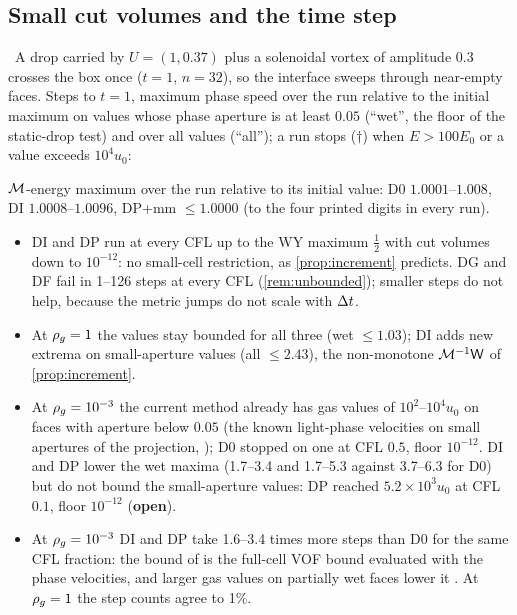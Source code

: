 \subsection{Small cut volumes and the time step}\label{sec:smallcell}
\meas\ A drop carried by $U=(1,0.37)$ plus a solenoidal vortex of amplitude $0.3$ crosses
the box once ($t=1$, $n=32$), so the interface sweeps through near-empty faces.  Steps to
$t=1$, maximum phase speed over the run relative to the initial maximum on values whose phase
aperture is at least $0.05$ (``wet'', the floor of the static-drop test) and over all values
(``all''); a run stops ($\dagger$) when $E>100E_0$ or a value exceeds $10^4u_0$:

$\mathcal M$-energy maximum over the run relative to its initial value: D0 $1.0001$--$1.008$, DI
$1.0008$--$1.0096$, DP+mm $\le1.0000$ (to the four printed digits in every run).
\begin{itemize}[leftmargin=*,itemsep=1pt]
\item DI and DP run at every CFL up to the WY maximum $\tfrac12$ with cut volumes down to
  $10^{-12}$: no small-cell restriction, as \cref{prop:increment} predicts.  DG and DF fail
  in 1--126 steps at every CFL (\cref{rem:unbounded}); smaller steps do not help, because the
  metric jumps do not scale with $\Delta t$.
\item At $\rho_g=1$ the values stay bounded for all three (wet $\le1.03$); DI adds new
  extrema on small-aperture values (all $\le2.43$), the non-monotone $\mathcal M^{-1}\mathsf W$ of
  \cref{prop:increment}.
\item At $\rho_g=10^{-3}$ the current method already has gas values of $10^2$--$10^4u_0$ on
  faces with aperture below $0.05$ (the known light-phase velocities on small apertures of
  the projection, ); D0 stopped on one at CFL $0.5$, floor $10^{-12}$.
  DI and DP lower the wet maxima (1.7--3.4 and 1.7--5.3 against 3.7--6.3 for D0) but do not
  bound the small-aperture values: DP reached $5.2\times10^3u_0$ at CFL $0.1$, floor $10^{-12}$
  (\textbf{open}).
\item At $\rho_g=10^{-3}$ DI and DP take 1.6--3.4 times more steps than D0 for the same
  CFL fraction: the bound of  is the full-cell VOF bound evaluated with
  the phase velocities, and larger gas values on partially wet faces lower it \infr.  At
  $\rho_g=1$ the step counts agree to 1\%.
\end{itemize}

